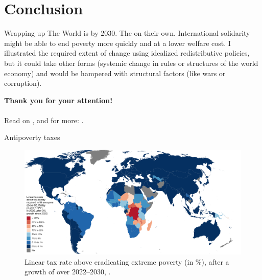 \documentclass[aspectratio=169,xcolor=dvipsnames, 11pt,mathserif]{beamer}
\begin{document}
\section{Conclusion}

\begin{frame}{Wrapping up}
    \bbsp \ip The World is  by 2030.
    \ip The  on their own. %
    \ip International solidarity might be able to end poverty more quickly and at a lower welfare cost.
    \ip I illustrated the required extent of change using idealized redistributive policies, but it could take other forms (systemic change in rules or structures of the world economy) and would be hampered with structural factors (like wars or corruption).
    \ip \quad
    \ip \begin{center} \textbf{Thank you for your attention!} \\ \quad \\  Read  on , and for more: . \end{center}
    \ee
\end{frame}



\appendix

\begin{frame}{Antipoverty taxes}    
    \begin{figure}
      \caption{Linear tax rate above  eradicating extreme poverty (in \%), after a growth of  over 2022--2030, . 
      }
      \includegraphics[height=.85\textheight]{../figures/s_antipoverty_2_tax_7_average.pdf}
    \end{figure}
\end{frame}
\end{document}
